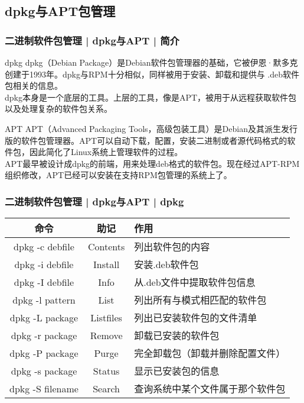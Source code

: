 \subsection{dpkg与APT包管理}
\begin{frame}
  \frametitle{二进制软件包管理 | dpkg与APT | 简介}
  \begin{block}{dpkg}
  dpkg（Debian Package）是Debian软件包管理器的基础，它被伊恩·默多克创建于1993年。dpkg与RPM十分相似，同样被用于安装、卸载和提供与 .deb软件包相关的信息。\\ 

  dpkg本身是一个底层的工具。上层的工具，像是APT，被用于从远程获取软件包以及处理复杂的软件包关系。
  \end{block}
  \pause
  \begin{block}{APT}
  APT（Advanced Packaging Tools，高级包装工具）是Debian及其派生发行版的软件包管理器。APT可以自动下载，配置，安装二进制或者源代码格式的软件包，因此简化了Linux系统上管理软件的过程。\\
  APT最早被设计成dpkg的前端，用来处理deb格式的软件包。现在经过APT-RPM组织修改，APT已经可以安装在支持RPM包管理的系统上了。
  \end{block}
\end{frame}

\begin{frame}
  \frametitle{二进制软件包管理 | dpkg与APT | \alert{dpkg}}
  \begin{table}
    \centering
    \begin{tabularx}{\textwidth}{ccX}
      \hline
      \rowcolor{blue!50}命令 & 助记 & 作用\\
      \hline
      dpkg -c debfile & Contents & 列出软件包的内容\\
      dpkg -i debfile & Install & 安装.deb软件包\\
      dpkg -I debfile & Info & 从.deb文件中提取软件包信息\\
      dpkg -l pattern & List & 列出所有与模式相匹配的软件包\\
      dpkg -L package & Listfiles & 列出已安装软件包的文件清单\\
      dpkg -r package & Remove & 卸载已安装的软件包\\
      dpkg -P package & Purge & 完全卸载包（卸载并删除配置文件）\\
      dpkg -s package & Status & 显示已安装包的信息\\
      dpkg -S filename & Search & 查询系统中某个文件属于那个软件包\\
      \hline
    \end{tabularx}
  \end{table}
\end{frame}

